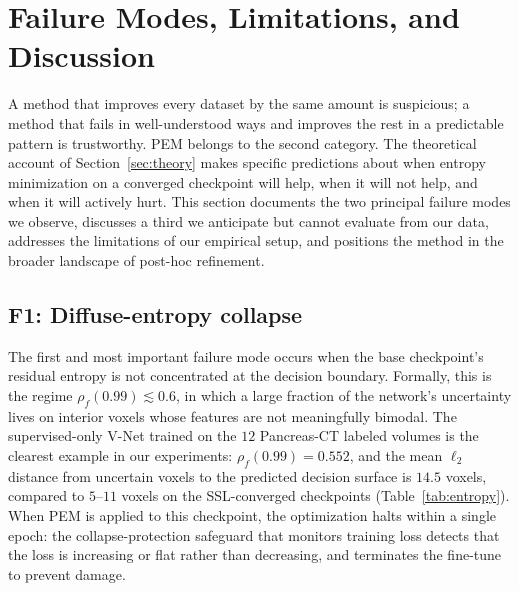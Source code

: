 \section{Failure Modes, Limitations, and Discussion}
\label{sec:discussion}

A method that improves every dataset by the same amount is suspicious; a method that fails in well-understood ways and improves the rest in a predictable pattern is trustworthy. PEM belongs to the second category. The theoretical account of Section~\ref{sec:theory} makes specific predictions about when entropy minimization on a converged checkpoint will help, when it will not help, and when it will actively hurt. This section documents the two principal failure modes we observe, discusses a third we anticipate but cannot evaluate from our data, addresses the limitations of our empirical setup, and positions the method in the broader landscape of post-hoc refinement.

\subsection{F1: Diffuse-entropy collapse}
\label{sec:disc:f1}

The first and most important failure mode occurs when the base checkpoint's residual entropy is not concentrated at the decision boundary. Formally, this is the regime $\rho_f(0.99) \lesssim 0.6$, in which a large fraction of the network's uncertainty lives on interior voxels whose features are not meaningfully bimodal. The supervised-only V-Net trained on the $12$ Pancreas-CT labeled volumes is the clearest example in our experiments: $\rho_f(0.99)\!=\!0.552$, and the mean $\ell_2$ distance from uncertain voxels to the predicted decision surface is $14.5$ voxels, compared to $5$--$11$ voxels on the SSL-converged checkpoints (Table~\ref{tab:entropy}). When PEM is applied to this checkpoint, the optimization halts within a single epoch: the collapse-protection safeguard that monitors training loss detects that the loss is increasing or flat rather than decreasing, and terminates the fine-tune to prevent damage.

